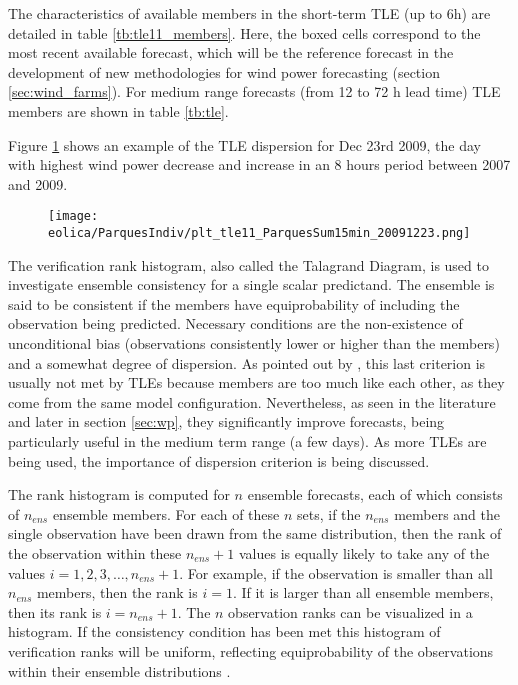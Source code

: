 The characteristics of available members in the short-term TLE (up to 6h) are detailed in table \ref{tb:tle11_members}. Here, the boxed cells correspond to the most recent available forecast, which will be the reference forecast in the development of new methodologies for wind power forecasting (section \ref{sec:wind_farms}). For medium range forecasts (from 12 to 72 h lead time) TLE members are shown in table \ref{tb:tle}. 


\FloatBarrier


\FloatBarrier

Figure \ref{fig:tle_20091223} shows an example of the TLE dispersion for Dec 23rd 2009, the day with highest wind power decrease and increase in an 8 hours period between 2007 and 2009.

\begin{figure}[!htp]
    \centering
     \texttt{[image: eolica/ParquesIndiv/plt\_tle11\_ParquesSum15min\_20091223.png]}
    \label{fig:tle_20091223}
\end{figure}
\FloatBarrier

The verification rank histogram, also called the Talagrand Diagram, is used to investigate ensemble consistency for a single scalar predictand. The ensemble is said to be consistent if the members have equiprobability of including the observation being predicted. Necessary conditions are the non-existence of unconditional bias (observations consistently lower or higher than the members) and a somewhat degree of dispersion. As pointed out by \cite{Lu2007}, this last criterion is usually not met by TLEs because members are too much like each other, as they come from the same model configuration. Nevertheless, as seen in the literature and later in section \ref{sec:wp}, they significantly improve forecasts, being particularly useful in the medium term range (a few days). As more TLEs are being used, the importance of dispersion criterion is being discussed.

The rank histogram is computed for $n$ ensemble forecasts, each of which consists of $n_{ens}$ ensemble members. For each of these $n$ sets, if the $n_{ens}$ members and the single observation have been drawn from the same distribution, then the rank of the observation within these $n_{ens}+1$ values is equally likely to take any of the values $i=1, 2, 3, \ldots, n_{ens}+1$. For example, if the observation is smaller than all $n_{ens}$ members, then the rank is $i=1$. If it is larger than all ensemble members, then its rank is $i=n_{ens}+1$. The $n$ observation ranks can be visualized in a histogram. If the consistency condition has been met this histogram of verification ranks will be uniform, reflecting equiprobability of the observations within their ensemble distributions \citep{Wilks2005}. 

